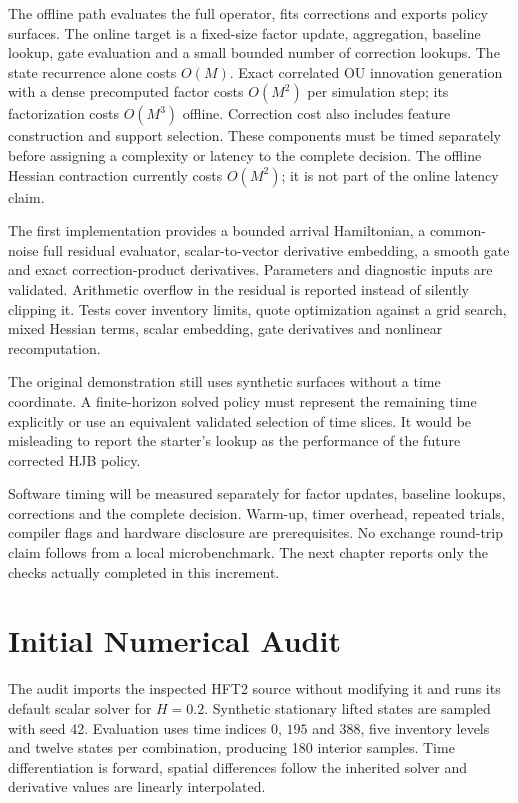 The offline path evaluates the full operator, fits corrections and exports policy surfaces. The online target is a fixed-size factor update, aggregation, baseline lookup, gate evaluation and a small bounded number of correction lookups. The state recurrence alone costs $O(M)$. Exact correlated OU innovation generation with a dense precomputed factor costs $O(M^2)$ per simulation step; its factorization costs $O(M^3)$ offline. Correction cost also includes feature construction and support selection. These components must be timed separately before assigning a complexity or latency to the complete decision. The offline Hessian contraction currently costs $O(M^2)$; it is not part of the online latency claim.

The first implementation provides a bounded arrival Hamiltonian, a common-noise full residual evaluator, scalar-to-vector derivative embedding, a smooth gate and exact correction-product derivatives. Parameters and diagnostic inputs are validated. Arithmetic overflow in the residual is reported instead of silently clipping it. Tests cover inventory limits, quote optimization against a grid search, mixed Hessian terms, scalar embedding, gate derivatives and nonlinear recomputation.

The original demonstration still uses synthetic surfaces without a time coordinate. A finite-horizon solved policy must represent the remaining time explicitly or use an equivalent validated selection of time slices. It would be misleading to report the starter's lookup as the performance of the future corrected HJB policy.

Software timing will be measured separately for factor updates, baseline lookups, corrections and the complete decision. Warm-up, timer overhead, repeated trials, compiler flags and hardware disclosure are prerequisites. No exchange round-trip claim follows from a local microbenchmark. The next chapter reports only the checks actually completed in this increment.

\chapter{Initial Numerical Audit}

The audit imports the inspected HFT2 source without modifying it and runs its default scalar solver for $H=0.2$. Synthetic stationary lifted states are sampled with seed 42. Evaluation uses time indices $0$, $195$ and $388$, five inventory levels and twelve states per combination, producing 180 interior samples. Time differentiation is forward, spatial differences follow the inherited solver and derivative values are linearly interpolated.

